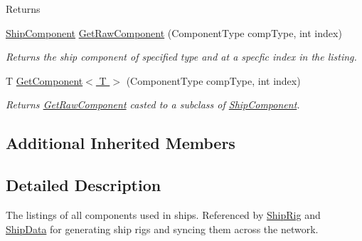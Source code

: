 \begin{DoxyCompactItemize}
\begin{DoxyCompactList}
\begin{DoxyReturn}{Returns}
\end{DoxyReturn}
 \end{DoxyCompactList}\item 
\hyperlink{class_skyrates_1_1_ship_1_1_ship_component}{Ship\-Component} \hyperlink{class_skyrates_1_1_ship_1_1_ship_component_list_a2bbeb0e895095601c7a70fb3954f6c17}{Get\-Raw\-Component} (Component\-Type comp\-Type, int index)
\begin{DoxyCompactList}\small\item\em Returns the ship component of specified type and at a specfic index in the listing. \end{DoxyCompactList}\item 
T \hyperlink{class_skyrates_1_1_ship_1_1_ship_component_list_aec118a46c41449adc8e75b12d8157ab5}{Get\-Component$<$ T $>$} (Component\-Type comp\-Type, int index)
\begin{DoxyCompactList}\small\item\em Returns \hyperlink{class_skyrates_1_1_ship_1_1_ship_component_list_a2bbeb0e895095601c7a70fb3954f6c17}{Get\-Raw\-Component} casted to a subclass of \hyperlink{class_skyrates_1_1_ship_1_1_ship_component}{Ship\-Component}. \end{DoxyCompactList}\end{DoxyCompactItemize}
\subsection*{Additional Inherited Members}


\subsection{Detailed Description}
The listings of all components used in ships. Referenced by \hyperlink{class_skyrates_1_1_ship_1_1_ship_rig}{Ship\-Rig} and \hyperlink{class_skyrates_1_1_ship_1_1_ship_data}{Ship\-Data} for generating ship rigs and syncing them across the network. 



